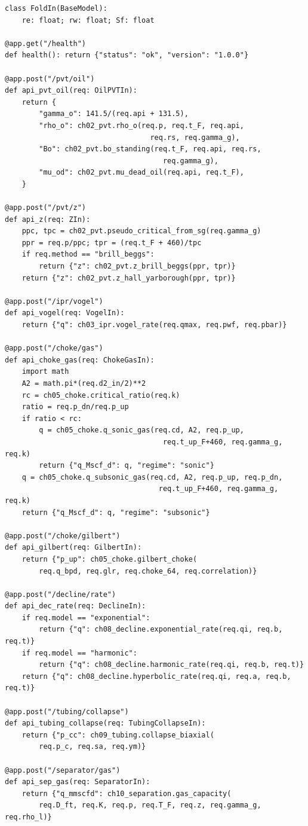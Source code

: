 \documentclass[10pt,a4paper,openany]{book}
\begin{document}
\begin{lstlisting}
class FoldIn(BaseModel):
    re: float; rw: float; Sf: float

@app.get("/health")
def health(): return {"status": "ok", "version": "1.0.0"}

@app.post("/pvt/oil")
def api_pvt_oil(req: OilPVTIn):
    return {
        "gamma_o": 141.5/(req.api + 131.5),
        "rho_o": ch02_pvt.rho_o(req.p, req.t_F, req.api,
                                  req.rs, req.gamma_g),
        "Bo": ch02_pvt.bo_standing(req.t_F, req.api, req.rs,
                                     req.gamma_g),
        "mu_od": ch02_pvt.mu_dead_oil(req.api, req.t_F),
    }

@app.post("/pvt/z")
def api_z(req: ZIn):
    ppc, tpc = ch02_pvt.pseudo_critical_from_sg(req.gamma_g)
    ppr = req.p/ppc; tpr = (req.t_F + 460)/tpc
    if req.method == "brill_beggs":
        return {"z": ch02_pvt.z_brill_beggs(ppr, tpr)}
    return {"z": ch02_pvt.z_hall_yarborough(ppr, tpr)}

@app.post("/ipr/vogel")
def api_vogel(req: VogelIn):
    return {"q": ch03_ipr.vogel_rate(req.qmax, req.pwf, req.pbar)}

@app.post("/choke/gas")
def api_choke_gas(req: ChokeGasIn):
    import math
    A2 = math.pi*(req.d2_in/2)**2
    rc = ch05_choke.critical_ratio(req.k)
    ratio = req.p_dn/req.p_up
    if ratio < rc:
        q = ch05_choke.q_sonic_gas(req.cd, A2, req.p_up,
                                     req.t_up_F+460, req.gamma_g, req.k)
        return {"q_Mscf_d": q, "regime": "sonic"}
    q = ch05_choke.q_subsonic_gas(req.cd, A2, req.p_up, req.p_dn,
                                    req.t_up_F+460, req.gamma_g, req.k)
    return {"q_Mscf_d": q, "regime": "subsonic"}

@app.post("/choke/gilbert")
def api_gilbert(req: GilbertIn):
    return {"p_up": ch05_choke.gilbert_choke(
        req.q_bpd, req.glr, req.choke_64, req.correlation)}

@app.post("/decline/rate")
def api_dec_rate(req: DeclineIn):
    if req.model == "exponential":
        return {"q": ch08_decline.exponential_rate(req.qi, req.b, req.t)}
    if req.model == "harmonic":
        return {"q": ch08_decline.harmonic_rate(req.qi, req.b, req.t)}
    return {"q": ch08_decline.hyperbolic_rate(req.qi, req.a, req.b, req.t)}

@app.post("/tubing/collapse")
def api_tubing_collapse(req: TubingCollapseIn):
    return {"p_cc": ch09_tubing.collapse_biaxial(
        req.p_c, req.sa, req.ym)}

@app.post("/separator/gas")
def api_sep_gas(req: SeparatorIn):
    return {"q_mmscfd": ch10_separation.gas_capacity(
        req.D_ft, req.K, req.p, req.T_F, req.z, req.gamma_g, req.rho_l)}


\end{lstlisting}
\end{document}
